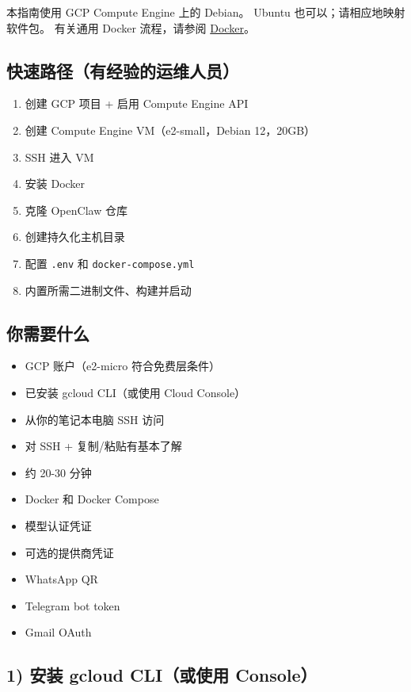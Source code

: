 本指南使用 GCP Compute Engine 上的 Debian。
Ubuntu 也可以；请相应地映射软件包。
有关通用 Docker 流程，请参阅 \href{/install/docker}{Docker}。

\hrulefill


\subsection{快速路径（有经验的运维人员）}


\begin{enumerate}
  \item 创建 GCP 项目 + 启用 Compute Engine API
  \item 创建 Compute Engine VM（e2-small，Debian 12，20GB）
  \item SSH 进入 VM
  \item 安装 Docker
  \item 克隆 OpenClaw 仓库
  \item 创建持久化主机目录
  \item 配置 \texttt{.env} 和 \texttt{docker-compose.yml}
  \item 内置所需二进制文件、构建并启动
\end{enumerate}


\hrulefill


\subsection{你需要什么}


\begin{itemize}
  \item GCP 账户（e2-micro 符合免费层条件）
  \item 已安装 gcloud CLI（或使用 Cloud Console）
  \item 从你的笔记本电脑 SSH 访问
  \item 对 SSH + 复制/粘贴有基本了解
  \item 约 20-30 分钟
  \item Docker 和 Docker Compose
  \item 模型认证凭证
  \item 可选的提供商凭证
  \item WhatsApp QR
  \item Telegram bot token
  \item Gmail OAuth
\end{itemize}


\hrulefill


\subsection{1) 安装 gcloud CLI（或使用 Console）}


